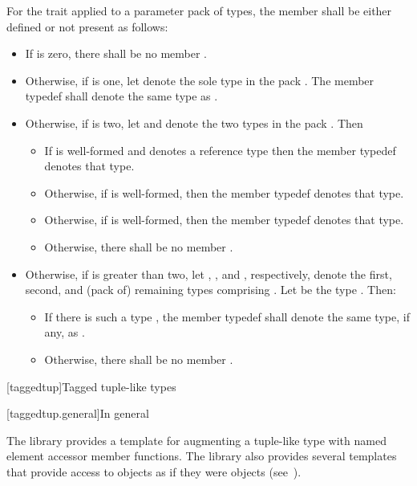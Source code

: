 {\color{addclr}
\pnum
For the  trait applied to a parameter pack  of
types, the member  shall be either defined or not present as follows:
\begin{itemize}
\item If  is zero, there shall be no member .
\item Otherwise, if  is one, let  denote the sole
  type in the pack . The member typedef  shall denote the
  same type as .
\item Otherwise, if  is two, let  and 
  denote the two types in the pack . Then
\begin{itemize}
\item If  is well-formed and denotes a reference type
  then the member typedef  denotes that type.
\item Otherwise, if  is well-formed, then the member typedef
   denotes that type.
\item Otherwise, if  is well-formed, then the
  member typedef  denotes that type.
\item Otherwise, there shall be no member .
\end{itemize}
\item Otherwise, if  is greater than two, let ,
  , and , respectively, denote the first, second, and
  (pack of) remaining types comprising . Let  be the type
  . Then:
\begin{itemize}
\item If there is such a type , the member typedef  shall
  denote the same type, if any, as .
\item Otherwise, there shall be no member .
\end{itemize}
\end{itemize}
} %

[taggedtup]{Tagged tuple-like types}

[taggedtup.general]{In general}

\pnum The library provides a template for augmenting a tuple-like type with named element accessor
member functions. The library also provides several templates that provide access to 
objects as if they were  objects (see~).

